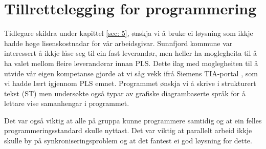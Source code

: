 \chapter{Tillrettelegging for programmering}
\thispagestyle{fancy}
\label{sec:7} 

Tidlegare skildra under kapittel \ref{sec: 5}, ønskja vi å bruke ei løysning som ikkje hadde høge lisenskostnadar for vår arbeidsgivar. 
Sunnfjord kommune var interessert å ikkje låse seg til ein fast leverandør, men heller ha moglegheita til å ha valet mellom fleire 
leverandørar innan \gls{PLS}. Dette ilag med moglegheiten til å utvide vår eigen kompetanse 
gjorde at vi såg vekk ifrå Siemens \gls{TIA}-portal \citep{Siemens}, som vi hadde lært igjennom \gls{PLS} emnet.
Programmet ønskja vi å skrive i strukturert tekst (\gls{ST}) men undersøkte også 
typar av grafiske diagrambaserte språk for å lettare vise samanhengar i programmet.

Det var også viktig at alle på gruppa kunne programmere samtidig og at ein felles programmeringsstandard skulle nyttast.
Det var viktig at parallelt arbeid ikkje skulle by på synkroniseringsproblem og at det fantest ei god løysning for dette.

